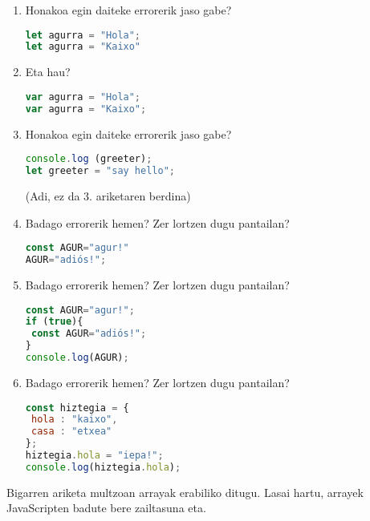 \begin{enumerate}
\item Honakoa egin daiteke errorerik jaso gabe?

\begin{lstlisting}[language=JavaScript,numbers=none]
let agurra = "Hola";
let agurra = "Kaixo"
 \end{lstlisting}
 
 \item  Eta hau?
\begin{lstlisting}[language=JavaScript,numbers=none]
var agurra = "Hola";
var agurra = "Kaixo";
 \end{lstlisting}
 
 \item  Honakoa egin daiteke errorerik jaso gabe?
 
\begin{lstlisting}[language=JavaScript,numbers=none]
console.log (greeter);
let greeter = "say hello";
 \end{lstlisting}
 (Adi, ez da 3. ariketaren berdina)
 
 \item Badago errorerik hemen? Zer lortzen dugu pantailan?
\begin{lstlisting}[language=JavaScript,numbers=none]
const AGUR="agur!"
AGUR="adiós!";
 \end{lstlisting}
 
 \item Badago errorerik hemen? Zer lortzen dugu pantailan?
\begin{lstlisting}[language=JavaScript,numbers=none]
const AGUR="agur!";
if (true){
 const AGUR="adiós!";
}
console.log(AGUR);
 \end{lstlisting}
 
 \item  Badago errorerik hemen? Zer lortzen dugu pantailan?
 
\begin{lstlisting}[language=JavaScript,numbers=none]
const hiztegia = {
 hola : "kaixo",
 casa : "etxea"
};
hiztegia.hola = "iepa!";
console.log(hiztegia.hola);
 \end{lstlisting}

\end{enumerate}

Bigarren ariketa multzoan arrayak erabiliko ditugu. Lasai hartu, arrayek JavaScripten badute bere zailtasuna eta.
 
